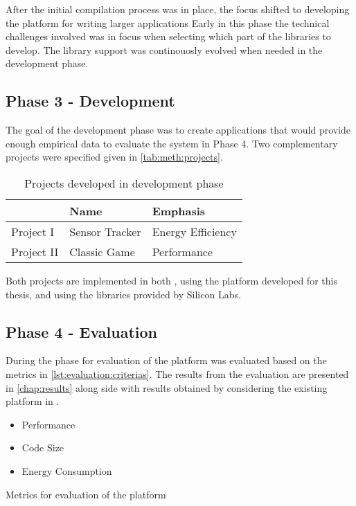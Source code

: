 After the initial compilation process was in place, the focus shifted to developing the platform for writing larger applications
Early in this phase the technical challenges involved was in focus when selecting which part of the libraries to develop.
The library support was continouosly evolved when needed in the development phase.

\subsection{Phase 3 - Development}
\label{sec:projects}

The goal of the development phase was to create applications that would provide enough empirical data to evaluate the system in Phase 4.
Two complementary projects were specified given in \autoref{tab:meth:projects}.

\begin{table}[H]
  \centering
  \begin{tabular}{l|l|l}
    & \textbf{Name} & \textbf{Emphasis} \\
    \hline
    Project I & Sensor Tracker & Energy Efficiency \\
    Project II & Classic Game & Performance \\
    \hline
  \end{tabular}
  \caption{Projects developed in development phase}
  \label{tab:meth:projects}
\end{table}

Both projects are implemented in both {\rust}, using the platform developed for this thesis, and {\C} using the libraries provided by Silicon Labs.

\subsection{Phase 4 - Evaluation}
During the phase for evaluation of the platform was evaluated based on the metrics in \autoref{lst:evaluation:criterias}.
The results from the evaluation are presented in \autoref{chap:results} along side with results obtained by considering the existing platform in {\C}.

\begin{listing}
  \begin{itemize}
  \item Performance
  \item Code Size
  \item Energy Consumption
  \end{itemize}
  \caption{Metrics for evaluation of the platform}
  \label{lst:evaluation:criterias}
\end{listing}
